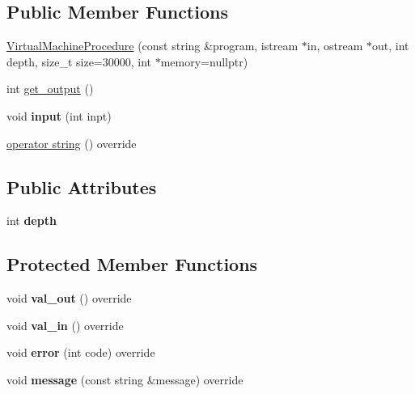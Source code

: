 \subsection*{Public Member Functions}
\begin{DoxyCompactItemize}
\item 
\hyperlink{classVirtualMachineProcedure_a3db90b62f4165b9d334134c361ebdc30}{Virtual\+Machine\+Procedure} (const string \&program, istream $\ast$in, ostream $\ast$out, int depth, size\+\_\+t size=30000, int $\ast$memory=nullptr)
\item 
int \hyperlink{classVirtualMachineProcedure_a608e8e83938e5b29a11c5b26671d3654}{get\+\_\+output} ()
\item 
\mbox{\label{classVirtualMachineProcedure_a71d8552422569e57903212d51f38c6ee}} 
void {\bfseries input} (int inpt)
\item 
\hyperlink{classVirtualMachineProcedure_aea6310148a612586e5fd9e30650decb6}{operator string} () override
\end{DoxyCompactItemize}
\subsection*{Public Attributes}
\begin{DoxyCompactItemize}
\item 
\mbox{\label{classVirtualMachineProcedure_a95e6694d96087741291ca2ecf3009b97}} 
int {\bfseries depth}
\end{DoxyCompactItemize}
\subsection*{Protected Member Functions}
\begin{DoxyCompactItemize}
\item 
\mbox{\label{classVirtualMachineProcedure_aa6f5e4488e0b6a09da5d27fa2cf8e156}} 
void {\bfseries val\+\_\+out} () override
\item 
\mbox{\label{classVirtualMachineProcedure_a868e4133bc5fcfb969de2d3d6f6008fe}} 
void {\bfseries val\+\_\+in} () override
\item 
\mbox{\label{classVirtualMachineProcedure_a20aa263ac34a0e01d5a11cbfe919cb4f}} 
void {\bfseries error} (int code) override
\item 
\mbox{\label{classVirtualMachineProcedure_a755d40765bb540503a9bea5ffd091a46}} 
void {\bfseries message} (const string \&message) override
\end{DoxyCompactItemize}
